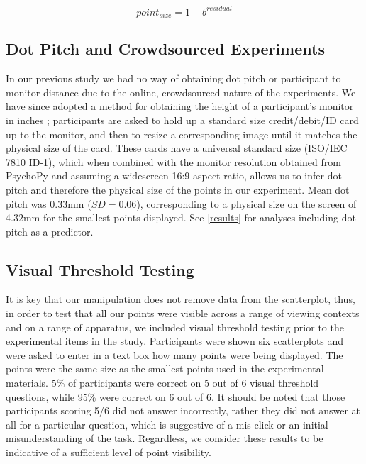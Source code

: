\documentclass{vgtc}                          %
\begin{document}
\begin{equation}
  point_{size} = 1 - b^{residual}
\end{equation}

\hypertarget{dot-pitch-and-crowdsourced-experiments}{%
\subsection{Dot Pitch and Crowdsourced Experiments}\label{dot-pitch-and-crowdsourced-experiments}}

In our previous study \cite{strain_2023} we had no way of obtaining dot pitch
or participant to monitor distance due to the online, crowdsourced nature of the
experiments. We have since adopted a method for obtaining the height of a
participant's monitor in inches \cite{screenscale}; participants are asked to hold up a standard size
credit/debit/ID card up to the monitor, and then to resize a corresponding image until
it matches the physical size of the card. These cards have a universal
standard size (ISO/IEC 7810 ID-1), which when combined with
the monitor resolution obtained from PsychoPy \cite{pierce_psychopy_2019}
and assuming a widescreen 16:9 aspect ratio,
allows us to infer dot pitch and therefore the physical size of the points in our
experiment. Mean dot pitch was 0.33mm (\(SD = 0.06\)),
corresponding to a physical size on the screen of 4.32mm
for the smallest points displayed. See \autoref{results} for analyses including dot pitch as a predictor.

\hypertarget{visual-threshold-testing}{%
\subsection{Visual Threshold Testing}\label{visual-threshold-testing}}

It is key that our manipulation does not remove data from the scatterplot,
thus, in order to test that all our points were visible across a range of viewing
contexts and on a range of apparatus, we included visual threshold testing prior
to the experimental items in the study. Participants were shown six scatterplots
and were asked to enter in a text box how many points
were being displayed. The points were the same size as the smallest points used
in the experimental materials. 5\% of
participants were correct on 5 out of 6 visual
threshold questions, while 95\% were correct
on 6 out of 6. It should be noted that those
participants scoring 5/6 did not answer incorrectly, rather they did not answer
at all for a particular question, which is suggestive of
a mis-click or an initial misunderstanding of the task. Regardless,
we consider these results to be indicative of a sufficient level of
point visibility.
\end{document}
